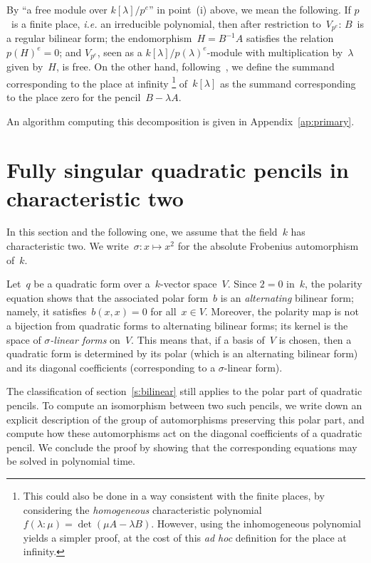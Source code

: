 \documentclass{lms}
\begin{document}
By ``a free module over $k[λ]/p^e$'' in point~(i) above,
we mean the following.
If $p$~is a finite place, \emph{i.e.} an irreducible polynomial, then
after restriction to~$V_{p^e}$: $B$~is a regular bilinear form;
the endomorphism~$H = B^{-1} A$ satisfies the relation $p(H)^e = 0$;
and $V_{p^e}$, seen as a $k[λ]/p(λ)^e$-module with
multiplication by~$λ$ given by~$H$, is free.
On the other hand, following~\cite[§~4]{inventiones1976waterhouse},
we define the summand corresponding to the place at infinity%
\footnote{This could also be done in a way consistent with the finite places,
by considering the \emph{homogeneous} characteristic polynomial
$f(λ: μ) = \det (μ A - λ B)$.
However, using the inhomogeneous polynomial yields a simpler proof,
at the cost of this \emph{ad hoc} definition for the place at infinity.}
of~$k[λ]$ as the summand corresponding to
the place zero for the pencil~$B - λ A$.

An algorithm computing this decomposition
is given in Appendix~\ref{ap:primary}.

\section{Fully singular quadratic pencils in characteristic two}
\label{S:quad-sing}
In this section and the following one, we assume that the field~$k$ has
characteristic two.
We write~$σ: x ↦ x^2$ for the absolute Frobenius automorphism of~$k$.

Let~$q$ be a quadratic form over a~$k$-vector space~$V$. Since $2 = 0$
in~$k$, the polarity equation shows that the associated polar form~$b$ is
an \emph{alternating} bilinear form; namely, it satisfies~$b(x,x) = 0$
for all~$x ∈ V$. Moreover, the polarity map is not a bijection from
quadratic forms to alternating bilinear forms; its kernel is the space of
\emph{$σ$-linear forms} on~$V$. This means that, if a basis of~$V$ is
chosen, then a quadratic form is determined by its polar (which is an
alternating bilinear form) and its diagonal coefficients (corresponding to a
$σ$-linear form).

The classification of section~\ref{s:bilinear} still applies to
the polar part of quadratic pencils.
To compute an isomorphism between two such pencils,
we write down an explicit description of the group of automorphisms
preserving this polar part,
and compute how these automorphisms act
on the diagonal coefficients of a quadratic pencil.
We conclude the proof by showing that the corresponding equations
may be solved in polynomial time.
\end{document}
